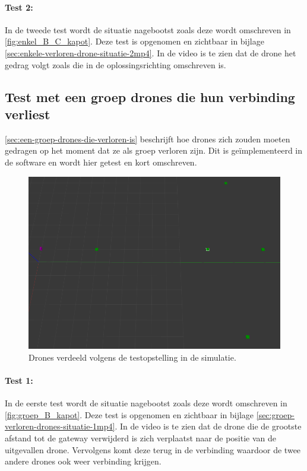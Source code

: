\documentclass[a4paper, 11pt, oneside]{report}
\begin{document}
\paragraph{Test 2:} In de tweede test wordt de situatie nagebootst zoals deze wordt omschreven in \autoref{fig:enkel_B_C_kapot}.
Deze test is opgenomen en zichtbaar in bijlage \ref{sec:enkele-verloren-drone-situatie-2mp4}.
In de video is te zien dat de drone het gedrag volgt zoals die in de oplossingsrichting omschreven is. 


\subsection{Test met een groep drones die hun verbinding verliest}
\autoref{sec:een-groep-drones-die-verloren-is} beschrijft hoe drones zich zouden moeten gedragen op het moment dat ze als groep verloren zijn.
Dit is geïmplementeerd in de software en wordt hier getest en kort omschreven.

\begin{figure}[H]
	\begin{center}\includegraphics[width=.7\linewidth]{Afbeeldingen/testopstelling2_in_simulatie.png}\end{center}
	\caption{Drones verdeeld volgens de testopstelling in de simulatie.}
	\label{fig:applicatie-testopstelling-2-drones-in-sim}
\end{figure}


\paragraph{Test 1:} In de eerste test wordt de situatie nagebootst zoals deze wordt omschreven in \autoref{fig:groep_B_kapot}.
Deze test is opgenomen en zichtbaar in bijlage \ref{sec:groep-verloren-drones-situatie-1mp4}. 
In de video is te zien dat de drone die de grootste afstand tot de gateway verwijderd is zich verplaatst naar de positie van de uitgevallen drone. Vervolgens komt deze terug in de verbinding waardoor de twee andere drones ook weer verbinding krijgen.  
\end{document}

